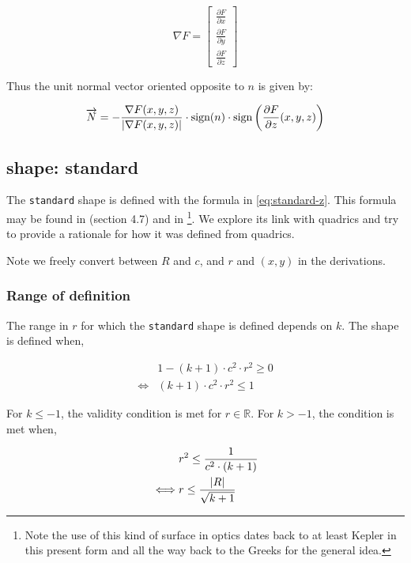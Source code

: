 \begin{equation}
\nabla F =
\begin{bmatrix}
\frac{\partial F}{\partial x} \\
\frac{\partial F}{\partial y} \\
\frac{\partial F}{\partial z}
\end{bmatrix}
\end{equation}

Thus the unit normal vector oriented opposite to $n$ is given by:

\begin{equation}
\overrightarrow{N} = - \frac{\nabla F (x, y, z)}
                          {\abs{\nabla F(x, y, z)}} \cdot
  \textrm{sign}(n) \cdot
  \textrm{sign}\left(\frac{\partial F}{\partial z}(x, y, z)\right)
\end{equation}

\subsection{shape: standard}
The \lstinline{standard} shape is defined with the formula in
\cref{eq:standard-z}. This formula may be found in \cite{Welford:1986}
(section 4.7) and in \cite{Greynolds:2002} \footnote{Note the use of this kind
of surface in optics dates back to at least Kepler in this present form and all
the way back to the Greeks for the general idea.}.  We explore its link with
quadrics and try to provide a rationale for how it was defined from quadrics.

Note we freely convert between $R$ and $c$, and $r$ and $(x, y)$ in
the derivations.

\subsubsection{Range of definition}
The range in $r$ for which the \lstinline{standard} shape is defined
depends on $k$. The shape is defined when,

\begin{equation} \begin{split}
& 1 - (k+1) \cdot c^2 \cdot r^2 \geq 0 \\
\iff & (k+1) \cdot c^2 \cdot r^2 \leq 1
\end{split} \end{equation}

For $k \leq -1$, the validity condition is met for $r \in \mathbb{R}$.
For $k > -1$, the condition is met when,

\begin{equation} \begin{split}
& r^2 \leq \frac{1}{c^2 \cdot (k+1)} \\
\iff & r \leq \frac{\abs{R}}{\sqrt{k+1}}
\end{split} \end{equation}

